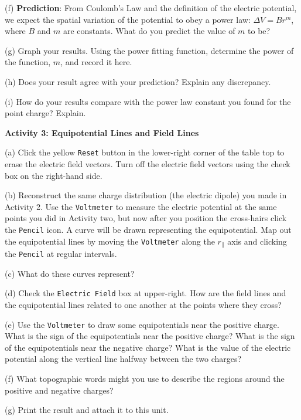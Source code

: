 (f) \textbf{Prediction}: From Coulomb's Law and the definition of the
electric potential, we expect the spatial variation of the potential
to obey a power law: \( \Delta V=Br^{m} \), where \( B \)
and \( m \) are constants. What do you predict the value of \textbf{\( m \)}
to be?\vspace{15mm}


(g) Graph your results. Using the power fitting
function, determine the power of the function, $m$, and record it here.
\vspace{15mm}

(h) Does your result agree with your prediction? Explain any discrepancy.
\vspace{15mm}

(i) How do your results compare with the power law constant you found
for the point charge? Explain.\vspace{15mm}


\textbf{Activity 3: Equipotential Lines and Field Lines}

(a) Click the yellow {\tt Reset} button in the lower-right corner of the table top
to erase the electric field vectors. 
Turn off the electric field vectors using the check box on the right-hand side.

(b) Reconstruct the same charge distribution (the electric dipole)
you made in Activity 2.
Use the {\tt Voltmeter} to measure the electric potential at the same points
you did in Activity two, but now after you position the cross-hairs click
the {\tt Pencil} icon.
A curve will be drawn representing the equipotential.
Map out the
equipotential lines by moving the {\tt Voltmeter} along the $r_\parallel$ axis  
and clicking the {\tt Pencil} at regular intervals.

(c) What do these curves represent?
\vspace{15mm}

(d) Check the {\tt Electric Field} box at upper-right.
How are the field lines and the equipotential lines related to one
another at the points where they cross?
\vspace{15mm}

(e) Use the {\tt Voltmeter} to draw some equipotentials near the positive 
charge. What is the sign of the equipotentials near the positive charge?
What is the sign of the equipotentials near the negative charge?
What is the value of the electric potential along the vertical line
halfway between the two charges?
\vspace{15mm}

(f) What topographic words might you use to describe the regions around the
positive and negative charges?
\vspace{15mm}

(g) Print the result and attach it to this unit.
